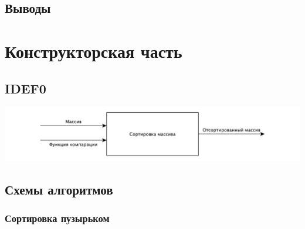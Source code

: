 \documentclass[a4paper,12pt]{article}
\begin{document}
\subsection{Выводы}

\newpage
\section{Конструкторская часть}

\subsection{IDEF0}

\begin{center}
    \includegraphics[scale=0.5]{IDEF0}
\end{center}

\subsection{Схемы алгоритмов}

\subsubsection{Сортировка пузырьком}
\end{document}
